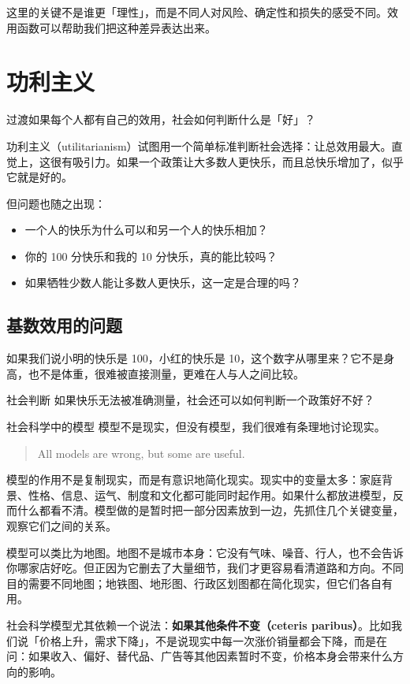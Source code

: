 \documentclass[10pt,a4paper]{ctexart}
\newcommand{\transitionnote}[1]{\begin{conceptbox}{过渡}#1\end{conceptbox}}
\begin{document}
这里的关键不是谁更「理性」，而是不同人对风险、确定性和损失的感受不同。效用函数可以帮助我们把这种差异表达出来。

\section{功利主义}

\transitionnote{如果每个人都有自己的效用，社会如何判断什么是「好」？}

功利主义（utilitarianism）试图用一个简单标准判断社会选择：让总效用最大。直觉上，这很有吸引力。如果一个政策让大多数人更快乐，而且总快乐增加了，似乎它就是好的。

但问题也随之出现：
\begin{itemize}
  \item 一个人的快乐为什么可以和另一个人的快乐相加？
  \item 你的 100 分快乐和我的 10 分快乐，真的能比较吗？
  \item 如果牺牲少数人能让多数人更快乐，这一定是合理的吗？
\end{itemize}

\subsection{基数效用的问题}

如果我们说小明的快乐是 100，小红的快乐是 10，这个数字从哪里来？它不是身高，也不是体重，很难被直接测量，更难在人与人之间比较。

\begin{discussionbox}{社会判断}
如果快乐无法被准确测量，社会还可以如何判断一个政策好不好？
\end{discussionbox}

\begin{conceptbox}{社会科学中的模型}
模型不是现实，但没有模型，我们很难有条理地讨论现实。

\begin{quote}
All models are wrong, but some are useful.
\end{quote}

模型的作用不是复制现实，而是有意识地简化现实。现实中的变量太多：家庭背景、性格、信息、运气、制度和文化都可能同时起作用。如果什么都放进模型，反而什么都看不清。模型做的是暂时把一部分因素放到一边，先抓住几个关键变量，观察它们之间的关系。

模型可以类比为地图。地图不是城市本身：它没有气味、噪音、行人，也不会告诉你哪家店好吃。但正因为它删去了大量细节，我们才更容易看清道路和方向。不同目的需要不同地图；地铁图、地形图、行政区划图都在简化现实，但它们各自有用。

社会科学模型尤其依赖一个说法：\textbf{如果其他条件不变（ceteris paribus）}。比如我们说「价格上升，需求下降」，不是说现实中每一次涨价销量都会下降，而是在问：如果收入、偏好、替代品、广告等其他因素暂时不变，价格本身会带来什么方向的影响。
\end{conceptbox}
\end{document}
